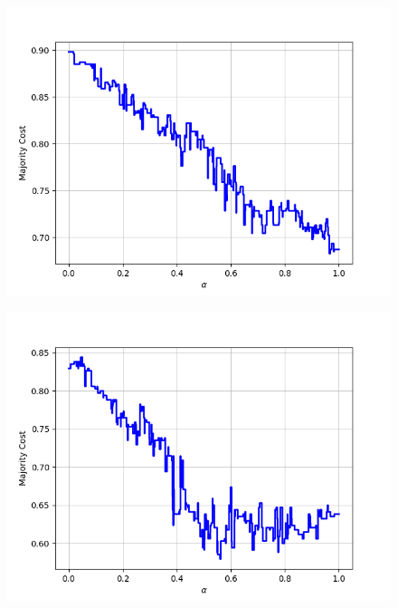 \begin{figure}[H]
\begin{minipage}{.24\textwidth}
  {\includegraphics[width=\linewidth]{plots/omniglot-intra-ac/Sanskrit}}
\end{minipage}
\begin{minipage}{.24\textwidth}
  \centering
  {\includegraphics[width=\linewidth]{plots/omniglot-intra-ac/Syriac_(Estrangelo)}}
\end{minipage}
\begin{minipage}{.24\textwidth}
  \centering

\end{minipage}
\end{figure}
